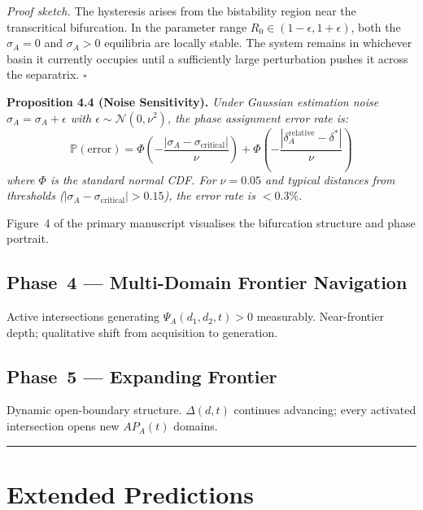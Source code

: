 \documentclass[11pt]{article}
\theoremstyle{definition}
\theoremstyle{plain}
\begin{document}
\textit{Proof sketch.} The hysteresis arises from the bistability region
near the transcritical bifurcation. In the parameter range
$R_0 \in (1 - \epsilon, 1 + \epsilon)$, both the $\sigma_A = 0$ and
$\sigma_A > 0$ equilibria are locally stable. The system remains in
whichever basin it currently occupies until a sufficiently large
perturbation pushes it across the separatrix. $\square$

\textbf{Proposition 4.4 (Noise Sensitivity).} %
\textit{Under Gaussian estimation noise $\hat{\sigma}_A = \sigma_A + \epsilon$
with $\epsilon \sim \mathcal{N}(0, \nu^2)$, the phase assignment error rate is:
\begin{equation}\label{eq:phase-error-rate}
\mathbb{P}(\text{error}) = \Phi\!\left(-\frac{|\sigma_A - \sigma_{\text{critical}}|}{\nu}\right) + \Phi\!\left(-\frac{|\delta_A^{\text{relative}} - \delta^*|}{\nu}\right)
\end{equation}
where $\Phi$ is the standard normal CDF. For $\nu = 0.05$ and typical
distances from thresholds ($|\sigma_A - \sigma_{\text{critical}}| > 0.15$),
the error rate is $< 0.3\%$.}



Figure~4 of the primary manuscript visualises the bifurcation structure and phase portrait.

\subsection*{Phase~4 --- Multi-Domain Frontier Navigation}

Active intersections generating $\Psi_A(d_1,d_2,t) > 0$ measurably.
Near-frontier depth; qualitative shift from acquisition to generation.

\subsection*{Phase~5 --- Expanding Frontier}

Dynamic open-boundary structure. $\Delta(d,t)$ continues advancing;
every activated intersection opens new $AP_A(t)$ domains.

\noindent\rule{\linewidth}{0.4pt}



\section{Extended Predictions}\label{sec:predictions}
\end{document}
